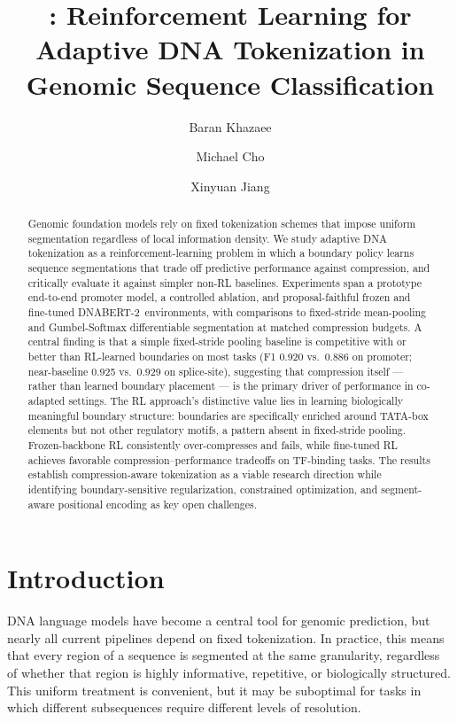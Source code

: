 \documentclass[sigconf,screen]{acmart}
\title{\method: Reinforcement Learning for Adaptive DNA Tokenization in Genomic Sequence Classification}
\author{Baran Khazaee}
\affiliation{%
  \institution{University of California Davis}
  \city{Davis}
  \country{USA}
}
\author{Michael Cho}
\affiliation{%
  \institution{University of California Davis}
  \city{Davis}
  \country{USA}
}
\author{Xinyuan Jiang}
\affiliation{%
  \institution{University of California Davis}
  \city{Davis}
  \country{USA}
}
\newcommand{\dnabert}{DNABERT-2\xspace}
\begin{document}
\begin{abstract}
Genomic foundation models rely on fixed tokenization schemes that impose uniform segmentation regardless of local information density. We study adaptive DNA tokenization as a reinforcement-learning problem in which a boundary policy learns sequence segmentations that trade off predictive performance against compression, and critically evaluate it against simpler non-RL baselines. Experiments span a prototype end-to-end promoter model, a controlled ablation, and proposal-faithful frozen and fine-tuned \dnabert~environments, with comparisons to fixed-stride mean-pooling and Gumbel-Softmax differentiable segmentation at matched compression budgets. A central finding is that a simple fixed-stride pooling baseline is competitive with or better than RL-learned boundaries on most tasks (F1 0.920 vs.\ 0.886 on promoter; near-baseline 0.925 vs.\ 0.929 on splice-site), suggesting that compression itself — rather than learned boundary placement — is the primary driver of performance in co-adapted settings. The RL approach's distinctive value lies in learning biologically meaningful boundary structure: boundaries are specifically enriched around TATA-box elements but not other regulatory motifs, a pattern absent in fixed-stride pooling. Frozen-backbone RL consistently over-compresses and fails, while fine-tuned RL achieves favorable compression–performance tradeoffs on TF-binding tasks. The results establish compression-aware tokenization as a viable research direction while identifying boundary-sensitive regularization, constrained optimization, and segment-aware positional encoding as key open challenges.
\end{abstract}


\maketitle
\pagestyle{plain}

\section{Introduction}
DNA language models have become a central tool for genomic prediction, but nearly all current pipelines depend on fixed tokenization. In practice, this means that every region of a sequence is segmented at the same granularity, regardless of whether that region is highly informative, repetitive, or biologically structured. This uniform treatment is convenient, but it may be suboptimal for tasks in which different subsequences require different levels of resolution.
\end{document}
